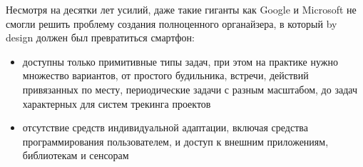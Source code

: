 \noindent
Несмотря на десятки лет усилий, даже такие гиганты как Google и Microsoft не
смогли решить проблему создания полноценного органайзера, в который by design
должен был превратиться смартфон:
\begin{itemize}
  \item доступны только примитивные типы задач, при этом на практике нужно
  множество вариантов, от простого будильника, встречи, действий привязанных по
  месту, периодические задачи с разным масштабом, до задач характерных для систем трекинга
  проектов 
  \item отсутствие средств индивидуальной адаптации, включая средства
  программирования пользователем, и доступ к внешним приложениям, библиотекам и
  сенсорам
\end{itemize}

\secup